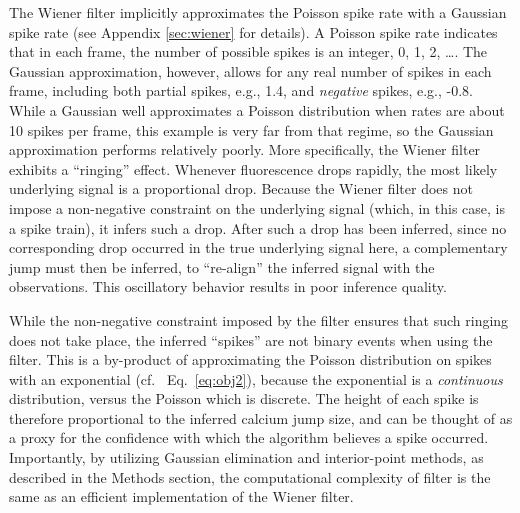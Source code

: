 The Wiener filter implicitly approximates the Poisson spike rate with a Gaussian spike rate (see Appendix \ref{sec:wiener} for details).  A Poisson spike rate indicates that in each frame, the number of possible spikes is an integer, 0, 1, 2, \ldots.  The Gaussian approximation, however, allows for any real number of spikes in each frame, including both partial spikes, e.g., 1.4, and \emph{negative} spikes, e.g., -0.8.  While a Gaussian well approximates a Poisson distribution when rates are about 10 spikes per frame, this example is very far from that regime, so the Gaussian approximation performs relatively poorly.  More specifically, the Wiener filter exhibits a ``ringing'' effect.  Whenever fluorescence drops rapidly, the most likely underlying signal is a proportional drop.  Because the Wiener filter does not impose a non-negative constraint on the underlying signal (which, in this case, is a spike train), it infers such a drop.  After such a drop has been inferred, since no corresponding drop occurred in the true underlying signal here, a complementary jump must then be inferred, to ``re-align'' the inferred signal with the observations.  This oscillatory behavior results in poor inference quality.


While the non-negative constraint imposed by the \foopsi filter ensures that such ringing does not take place, the inferred ``spikes'' are not binary events when using the \foopsi filter.  This is a by-product of approximating the Poisson distribution on spikes with an exponential (cf.~ Eq.~\eqref{eq:obj2}), because the exponential is a \emph{continuous} distribution, versus the Poisson which is discrete.  The height of each spike is therefore proportional to the inferred calcium jump size, and can be thought of as a proxy for the confidence with which the algorithm believes a spike occurred.   Importantly, by utilizing Gaussian elimination and interior-point methods, as described in the Methods section, the computational complexity of \foopsi filter is the same as an efficient implementation of the Wiener filter.  %



